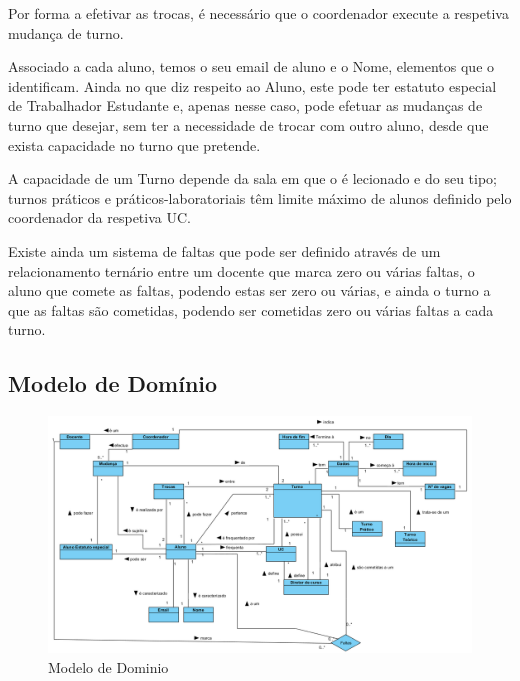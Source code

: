 \documentclass[12pt,a4paper]{report}
\begin{document}
Por forma a efetivar as trocas, é necessário que o coordenador execute a respetiva
mudança de turno.

Associado a cada aluno, temos o seu email de aluno e o Nome, elementos que o identificam. Ainda
no que diz respeito ao Aluno, este pode ter estatuto especial de Trabalhador Estudante e, apenas nesse caso, pode
efetuar as mudanças de turno que desejar, sem ter a necessidade de trocar com outro
aluno, desde que exista capacidade no turno que pretende. 

A capacidade de um Turno depende da
sala em que o é lecionado e do seu tipo; turnos práticos e práticos-laboratoriais têm limite máximo de alunos definido pelo coordenador da respetiva UC.

Existe ainda um sistema de faltas que pode ser definido através de um relacionamento ternário entre um docente que marca zero ou várias faltas, o aluno que comete as faltas, podendo estas ser zero ou várias, e ainda o turno a que as faltas são cometidas, podendo ser cometidas zero ou várias faltas a cada turno.


\begin{landscape}
\section{Modelo de Domínio}
\begin{figure}[H]
	\centering 
	\includegraphics[width=1.3\textwidth]{modelacao/modelo_dominio.png}  
	\caption{Modelo de Dominio}
\end{figure}
\vfill
\thispagestyle{empty}
\raisebox{0px}{\makebox[\linewidth]{\thepage}}
\end{landscape}
\end{document}
